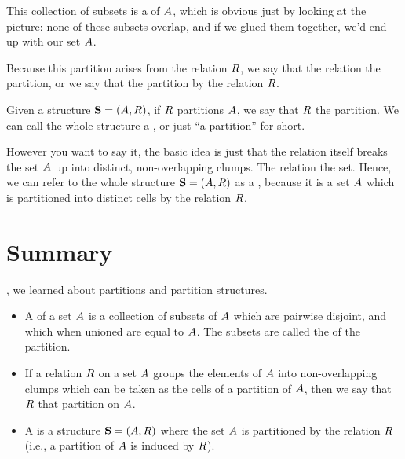 \documentclass[../../../main.tex]{subfiles}
\begin{document}
This collection of subsets is a  of $A$, which is obvious just by looking at the picture: none of these subsets overlap, and if we glued them together, we'd end up with our set $A$.

Because this partition arises from the relation $R$, we say that the relation  the partition, or we say that the partition  by the relation $R$.

\begin{terminology}
  Given a structure $\mathbf{S} = (A, R)$, if $R$ partitions $A$, we say that $R$  the partition. We can call the whole structure a , or just ``a partition'' for short.
\end{terminology}

However you want to say it, the basic idea is just that the relation itself breaks the set $A$ up into distinct, non-overlapping clumps. The relation  the set. Hence, we can refer to the whole structure $\mathbf{S} = (A, R)$ as a , because it is a set $A$ which is partitioned into distinct cells by the relation $R$.


\section{Summary}

, we learned about partitions and partition structures. 

\begin{itemize}

  \item A  of a set $A$ is a collection of subsets of $A$ which are pairwise disjoint, and which when unioned are equal to $A$. The subsets are called the  of the partition.
  
  \item If a relation $R$ on a set $A$ groups the elements of $A$ into non-overlapping clumps which can be taken as the cells of a partition of $A$, then we say that $R$  that partition on $A$.
  
  \item A  is a structure $\mathbf{S} = (A, R)$ where the set $A$ is partitioned by the relation $R$ (i.e., a partition of $A$ is induced by $R$).

\end{itemize}
\end{document}
